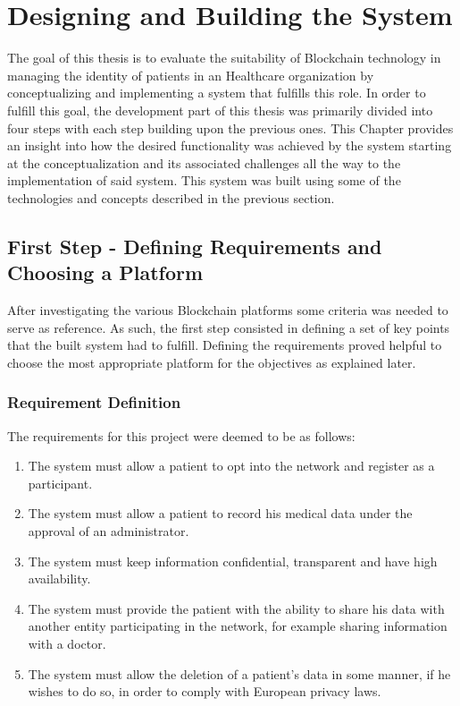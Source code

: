 \chapter{Designing and Building the System} \label{HLFHealthcare}  

The goal of this thesis is to evaluate the suitability of Blockchain technology
in managing the identity of patients in an Healthcare organization by
conceptualizing and implementing a system that fulfills this role. In order to
fulfill this goal, the development part of this thesis was primarily divided
into four steps with each step building upon the previous ones. This Chapter
provides an insight into how the desired functionality was achieved by the
system starting at the conceptualization and its associated challenges all the
way to the implementation of said system. This system was built using some of
the technologies and concepts described in the previous section.

\section{First Step - Defining Requirements and Choosing a 
	Platform}\label{choosingHyperledger}

After investigating the various Blockchain platforms some criteria was needed
to serve as reference. As such, the first step consisted in defining a set of
key points that the built system had to fulfill. Defining the requirements
proved helpful to choose the most appropriate platform for the objectives as
explained later.

\subsection{Requirement Definition}
The requirements for this project were deemed to be as follows:

\renewcommand{\labelenumi}{\Roman{enumi}.}
\begin{enumerate}
  \item The system must allow a patient to opt into the network and register as
    a participant.
  \item The system must allow a patient to record his medical data under the
    approval of an administrator.
  \item The system must keep information confidential, transparent and have
    high availability.
  \item The system must provide the patient with the ability to share his data
    with another entity participating in the network, for example sharing
    information with a doctor.
  \item The system must allow the deletion of a patient's data in some manner,
    if he wishes to do so, in order to comply with European privacy laws.
\end{enumerate}

